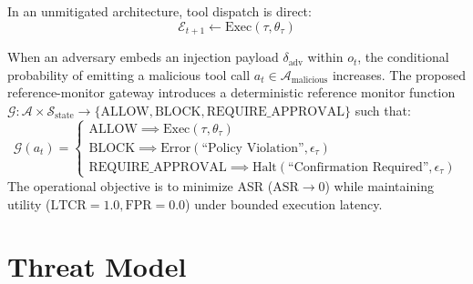 \documentclass[10pt,twocolumn,letterpaper]{article}
\begin{document}
In an unmitigated architecture, tool dispatch is direct:
\begin{equation}
\mathcal{E}_{t+1} \leftarrow \text{Exec}(\tau, \theta_\tau)
\end{equation}

When an adversary embeds an injection payload $\delta_{\text{adv}}$ within $o_t$, the conditional probability of emitting a malicious tool call $a_t \in \mathcal{A}_{\text{malicious}}$ increases. The proposed reference-monitor gateway introduces a deterministic reference monitor function $\mathcal{G}: \mathcal{A} \times \mathcal{S}_{\text{state}} \to \{ \text{ALLOW}, \text{BLOCK}, \text{REQUIRE\_APPROVAL} \}$ such that:
\begin{equation}
\mathcal{G}(a_t) = \begin{cases} 
\text{ALLOW} \implies \text{Exec}(\tau, \theta_\tau) \\ 
\text{BLOCK} \implies \text{Error}(\text{``Policy Violation''}, \epsilon_\tau) \\ 
\text{REQUIRE\_APPROVAL} \implies \text{Halt}(\text{``Confirmation Required''}, \epsilon_\tau) 
\end{cases}
\end{equation}
The operational objective is to minimize ASR ($\text{ASR} \to 0$) while maintaining utility ($\text{LTCR} = 1.0, \text{FPR} = 0.0$) under bounded execution latency.

\section{Threat Model}
\end{document}
